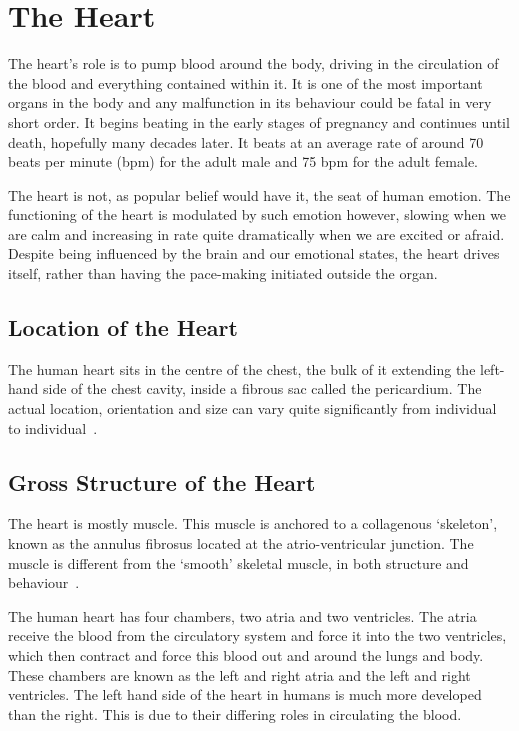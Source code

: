 \section{The Heart}

The heart's role is to pump blood around the body, driving in the circulation of
the blood and everything contained within it.  It is one of the most important
organs in the body and any malfunction in its behaviour could be fatal in very
short order.  It begins beating in the early stages of pregnancy and continues
until death, hopefully many decades later.  It beats at an average rate of
around 70 beats per minute (bpm) for the adult male and 75 bpm for the adult
female.

The heart is not, as popular belief would have it, the seat of human emotion.
The functioning of the heart is modulated by such emotion however, slowing when
we are calm and increasing in rate quite dramatically when we are excited or
afraid.  Despite being influenced by the brain and our emotional states, the
heart drives itself, rather than having the pace-making initiated outside the
organ.

\subsection{Location of the Heart}

The human heart sits in the centre of the chest, the bulk of it extending the
left-hand side of the chest cavity, inside a fibrous sac called the pericardium.
The actual location, orientation and size can vary quite significantly from
individual to individual~\cite{fumiepaper}.


\subsection{Gross Structure of the Heart}

The heart is mostly muscle.
This muscle is anchored to a collagenous `skeleton', known as the annulus
fibrosus located at the atrio-ventricular junction.
The muscle is different from the `smooth' skeletal muscle, in both structure
and behaviour~\cite{Katz2006}.

The human heart has four chambers, two atria and two ventricles.  The atria receive
the blood from the circulatory system and force it into the two ventricles,
which then contract and force this blood out and around the lungs and body.
These chambers are known as the left and right atria and the left and right
ventricles.  The left hand side of the heart in humans is much more developed
than the right.
This is due to their differing roles in circulating the blood.

